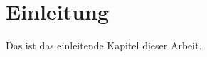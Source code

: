 \section{Einleitung}\label{sec:einleitung}

Das ist das einleitende Kapitel dieser Arbeit.\autocite{einstein}